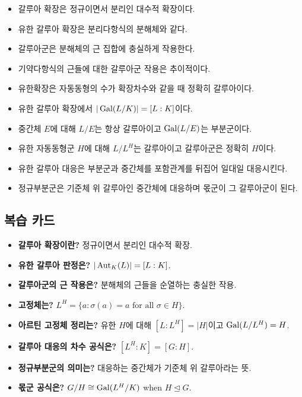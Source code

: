 \begin{chapterreview}
\begin{itemize}
  \item 갈루아 확장은 정규이면서 분리인 대수적 확장이다.
  \item 유한 갈루아 확장은 분리다항식의 분해체와 같다.
  \item 갈루아군은 분해체의 근 집합에 충실하게 작용한다.
  \item 기약다항식의 근들에 대한 갈루아군 작용은 추이적이다.
  \item 유한확장은 자동동형의 수가 확장차수와 같을 때 정확히 갈루아이다.
  \item 유한 갈루아 확장에서 $|\operatorname{Gal}(L/K)|=[L:K]$이다.
  \item 중간체 $E$에 대해 $L/E$는 항상 갈루아이고 $\operatorname{Gal}(L/E)$는 부분군이다.
  \item 유한 자동동형군 $H$에 대해 $L/L^H$는 갈루아이고 갈루아군은 정확히 $H$이다.
  \item 유한 갈루아 대응은 부분군과 중간체를 포함관계를 뒤집어 일대일 대응시킨다.
  \item 정규부분군은 기준체 위 갈루아인 중간체에 대응하며 몫군이 그 갈루아군이 된다.
\end{itemize}
\end{chapterreview}

\subsection*{복습 카드}

\begin{itemize}
  \item \textbf{갈루아 확장이란?} 정규이면서 분리인 대수적 확장.
  \item \textbf{유한 갈루아 판정은?} $|\operatorname{Aut}_K(L)|=[L:K]$.
  \item \textbf{갈루아군의 근 작용은?} 분해체의 근들을 순열하는 충실한 작용.
  \item \textbf{고정체는?} $L^H=\{a:\sigma(a)=a\text{ for all }\sigma\in H\}$.
  \item \textbf{아르틴 고정체 정리는?} 유한 $H$에 대해 $[L:L^H]=|H|$이고 $\operatorname{Gal}(L/L^H)=H$.
  \item \textbf{갈루아 대응의 차수 공식은?} $[L^H:K]=[G:H]$.
  \item \textbf{정규부분군의 의미는?} 대응하는 중간체가 기준체 위 갈루아라는 뜻.
  \item \textbf{몫군 공식은?} $G/H\cong\operatorname{Gal}(L^H/K)$ when $H\trianglelefteq G$.
\end{itemize}
